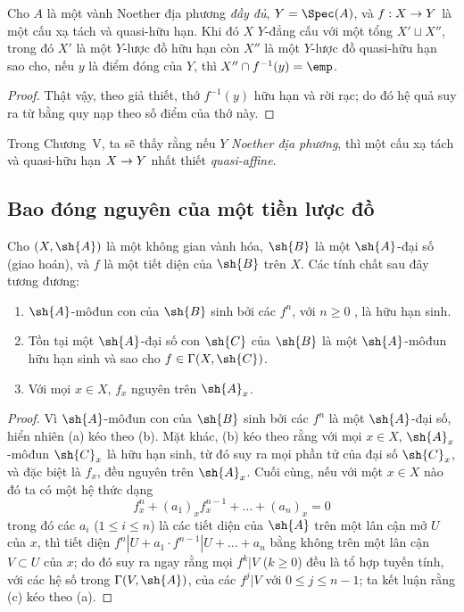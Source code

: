 \documentclass[oneside,10pt]{amsart}
\makeatletter
\renewcommand{\leq}{\leqslant}
\renewcommand{\geq}{\geqslant}
\newcommand{\ega@arrow}[2]{\mathchoice{#1}{#2}{#2}{#2}}
\renewcommand{\to}{\ega@arrow{\longrightarrow}{\rightarrow}}
\newcommand{\oldpage}[2][]{\marginnote{\normalfont\footnotesize\textbf{#1}~|~#2}\ignorespaces}
\let\EGAOriginalLabel\label
\renewcommand{\label}[1]{\phantomsection\EGAOriginalLabel{#1}}
\makeatother
\begin{document}
\begin{corollary}[6.2.6]
\label{II.6.2.6}
Cho $A$ là một vành Noether địa phương \emph{đầy đủ}, $Y=\Spec(A)$, và $f:X\to Y$ là một cấu xạ tách và quasi-hữu hạn.
Khi đó $X$ $Y$-đẳng cấu với một tổng $X'\sqcup X''$, trong đó $X'$ là một $Y$-lược đồ hữu hạn còn $X''$ là một $Y$-lược đồ quasi-hữu hạn sao cho, nếu $y$ là điểm đóng của $Y$, thì $X''\cap f^{-1}(y)=\emp$.
\end{corollary}

\begin{proof}
Thật vậy, theo giả thiết, thớ $f^{-1}(y)$ hữu hạn và rời rạc; do đó hệ quả suy ra từ  bằng quy nạp theo số điểm của thớ này.
\end{proof}

\begin{remark}[6.2.7]
\label{II.6.2.7}
Trong Chương~V, ta sẽ thấy rằng nếu $Y$ \emph{Noether địa phương}, thì một cấu xạ tách và quasi-hữu hạn $X\to Y$ nhất thiết \emph{quasi-affine}.
\end{remark}

\subsection{Bao đóng nguyên của một tiền lược đồ}
\label{subsection:II.6.3}

\begin{proposition}[6.3.1]
\label{II.6.3.1}
Cho $(X,\sh{A})$ là một không gian vành hóa, $\sh{B}$ là một $\sh{A}$-đại số (giao hoán), và $f$ là một tiết diện của $\sh{B}$ trên $X$.
Các tính chất sau đây tương đương:
\begin{enumerate}
  \item[\rm{(a)}] $\sh{A}$-môđun con của $\sh{B}$ sinh bởi các $f^n$, với $n\geq0$ , là hữu hạn sinh.
  \item[\rm{(b)}] Tồn tại một $\sh{A}$-đại số con $\sh{C}$ của $\sh{B}$ là một $\sh{A}$-môđun hữu hạn sinh và sao cho $f\in\Gamma(X,\sh{C})$.
  \item[\rm{(c)}] Với mọi $x\in X$, $f_x$ nguyên trên $\sh{A}_x$.
\end{enumerate}
\end{proposition}
\oldpage[II]{117}
\begin{proof}
Vì $\sh{A}$-môđun con của $\sh{B}$ sinh bởi các $f^n$ là một $\sh{A}$-đại số, hiển nhiên (a) kéo theo (b).
Mặt khác, (b) kéo theo rằng với mọi $x\in X$, $\sh{A}_x$-môđun $\sh{C}_x$ là hữu hạn sinh, từ đó suy ra mọi phần tử của đại số $\sh{C}_x$, và đặc biệt là $f_x$, đều nguyên trên $\sh{A}_x$.
Cuối cùng, nếu với một $x\in X$ nào đó ta có một hệ thức dạng
\[
  f_x^n+(a_1)_xf_x^{n-1}+\ldots+(a_n)_x=0
\]
trong đó các $a_i$ ($1\leq i\leq n$) là các tiết diện của $\sh{A}$ trên một lân cận mở $U$ của $x$, thì tiết diện $f^n|U+a_1\cdot f^{n-1}|U+\ldots+a_n$ bằng không trên một lân cận $V\subset U$ của $x$;
do đó suy ra ngay rằng mọi $f^k|V$ ($k\geq0$) đều là tổ hợp tuyến tính, với các hệ số trong $\Gamma(V,\sh{A})$, của các $f^j|V$ với $0\leq j\leq n-1$;
ta kết luận rằng (c) kéo theo (a).
\end{proof}
\end{document}
